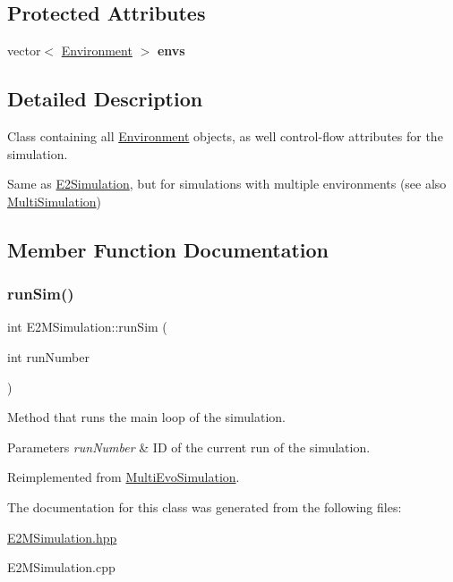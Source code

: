 \subsection*{Protected Attributes}
\begin{DoxyCompactItemize}
\item 
\mbox{\label{classE2MSimulation_ae77494b8c30893e459c995f95f671e4b}} 
vector$<$ \hyperlink{classEnvironment}{Environment} $>$ {\bfseries envs}
\end{DoxyCompactItemize}


\subsection{Detailed Description}
Class containing all \hyperlink{classEnvironment}{Environment} objects, as well control-\/flow attributes for the simulation. 

Same as \hyperlink{classE2Simulation}{E2\+Simulation}, but for simulations with multiple environments (see also \hyperlink{classMultiSimulation}{Multi\+Simulation}) 

\subsection{Member Function Documentation}
\mbox{\label{classE2MSimulation_aeac4e92c10f89a5c953ace5b1327d20b}} 
\subsubsection{\texorpdfstring{run\+Sim()}{runSim()}}
{\footnotesize\ttfamily int E2\+M\+Simulation\+::run\+Sim (\begin{DoxyParamCaption}\item[{int}]{run\+Number }\end{DoxyParamCaption})\hspace{0.3cm}{\ttfamily [virtual]}}



Method that runs the main loop of the simulation. 


\begin{DoxyParams}{Parameters}
{\em run\+Number} & ID of the current run of the simulation. \\
\hline
\end{DoxyParams}


Reimplemented from \hyperlink{classMultiEvoSimulation_a89c9806ac998c06230cdd41cc6a532bf}{Multi\+Evo\+Simulation}.



The documentation for this class was generated from the following files\+:\begin{DoxyCompactItemize}
\item 
\hyperlink{E2MSimulation_8hpp}{E2\+M\+Simulation.\+hpp}\item 
E2\+M\+Simulation.\+cpp\end{DoxyCompactItemize}
